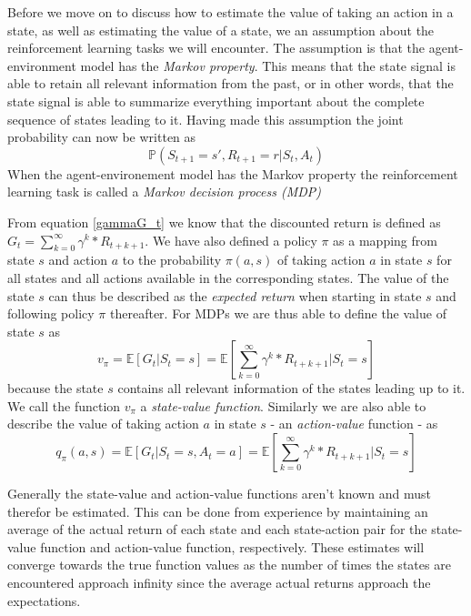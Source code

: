\documentclass[11pt]{article}
\begin{document}
Before we move on to discuss how to estimate the value of taking an action in a state, as
well as estimating the value of a state, we an assumption about the reinforcement
learning tasks we will encounter.
The assumption is that the agent-environment model has the \textit{Markov property}.
This means that the state signal is able to retain all relevant information
from the past, or in other words, that the state signal is able to summarize
everything important about the complete sequence of states leading to it.
Having made this assumption the joint probability can now be written as
\begin{equation}
    \mathds{P}(S_{t+1} = s', R_{t+1} = r | S_t, A_t)
\end{equation}
When the agent-environement model has the Markov property the reinforcement
learning task is called a \textit{Markov decision process (MDP)}

From equation \ref{gammaG_t} we know that the discounted return
is defined as $G_t = \sum\limits_{k=0}^\infty \gamma^k * R_{t+k+1}$.
We have also defined a policy $\pi$ as a mapping from state $s$ and action $a$
to the probability $\pi(a, s)$ of taking action $a$ in state $s$ for all states
and all actions available in the corresponding states.
The value of the state $s$ can thus be described as the \textit{expected return}
when starting in state $s$ and following policy $\pi$ thereafter\cite{RLBook}.
For MDPs we are thus able to define the value of state $s$ as
\begin{equation}
    v_\pi = \mathds{E}[G_t | S_t = s] = \mathds{E}[\sum\limits_{k=0}^\infty \gamma^k * R_{t+k+1} | S_t = s]
\end{equation}
because the state $s$ contains all relevant information of the states leading up to it.
We call the function $v_\pi$ a \textit{state-value function}.
Similarly we are also able to describe the value of taking action $a$ in state $s$ - an \textit{action-value} function - as
\begin{equation}
    q_\pi(a, s) = \mathds{E}[G_t | S_t = s, A_t = a] = \mathds{E}[\sum\limits_{k=0}^\infty \gamma^k * R_{t+k+1} | S_t = s]
\end{equation}

Generally the state-value and action-value functions aren't known and must therefor be
estimated.
This can be done from experience by maintaining an average of the actual return of each
state and each state-action pair for the state-value function and action-value
function, respectively.
These estimates will converge towards the true function values as the number of times
the states are encountered approach infinity since the average actual returns approach
the expectations.
\end{document}
